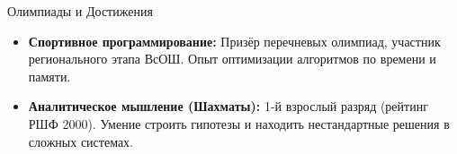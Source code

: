 \documentclass{resume} %
\begin{document}
\begin{rSection}{Олимпиады и Достижения}
\begin{itemize}
    \itemsep -3pt {}
    \item \textbf{Спортивное программирование:} Призёр перечневых олимпиад, участник регионального этапа ВсОШ. Опыт оптимизации алгоритмов по времени и памяти.
    \item \textbf{Аналитическое мышление (Шахматы):} 1-й взрослый разряд (рейтинг РШФ 2000). Умение строить гипотезы и находить нестандартные решения в сложных системах.
\end{itemize}
\end{rSection} 
\end{document}
